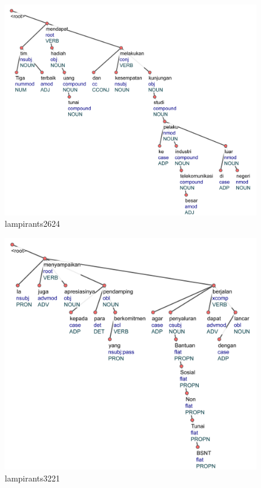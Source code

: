\begin{figure}
	\centering \includegraphics[width=0.8
	\textwidth] {pics/lampiran/lampirants2624.jpg} 
	\caption{lampirants2624} 
	\label{fig:lampirants2624} 
\end{figure}

\begin{figure}
	\centering \includegraphics[width=0.8
	\textwidth] {pics/lampiran/lampirants3221.jpg} 
	\caption{lampirants3221} 
	\label{fig:lampirants3221} 
\end{figure}



